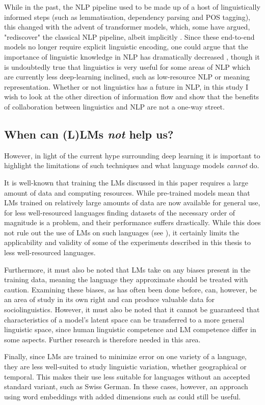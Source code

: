 While in the past, the NLP pipeline used to be made up of a host of linguistically informed steps (such as lemmatisation, dependency parsing and POS tagging), this changed with the advent of transformer models, which, some have argued, "rediscover" the classical NLP pipeline, albeit implicitly \citep{tenney2019bert}. Since these end-to-end models no longer require explicit linguistic encoding, one could argue that the importance of linguistic knowledge in NLP has dramatically decreased \citep{Church2021}, though it is undoubtedly true that linguistics is very useful for some areas of NLP which are currently less deep-learning inclined, such as low-resource NLP or meaning representation. Whether or not linguistics has a future in NLP, in this study I wish to look at the other direction of information flow and show that the benefits of collaboration between linguistics and NLP are not a one-way street.

\subsection*{When can (L)LMs \emph{not} help us?}
However, in light of the current hype surrounding deep learning it is important to highlight the limitations of such techniques and what language models \emph{cannot} do. 

It is well-known that training the LMs discussed in this paper requires a large amount of data and computing resources. While pre-trained models mean that LMs trained on relatively large amounts of data are now available for general use, for less well-resourced languages finding datasets of the necessary order of magnitude is a problem, and their performance suffers drastically. While this does not rule out the use of LMs on such languages (see \citep{kholodna2024llms}), it certainly limits the applicability and validity of some of the experiments described in this thesis to less well-resourced languages.

Furthermore, it must also be noted that LMs take on any biases present in the training data, meaning the language they approximate should be treated with caution. Examining these biases, as has often been done before, can, however, be an area of study in its own right and can produce valuable data for sociolinguistics. However, it must also be noted that it cannot be guaranteed that characteristics of a model's latent space can be transferred to a more general linguistic space, since human linguistic competence and LM competence differ in some aspects. Further research is therefore needed in this area.

Finally, since LMs are trained to minimize error on one variety of a language, they are less well-suited to study linguistic variation, whether geographical or temporal. This makes their use less suitable for languages without an accepted standard variant, such as Swiss German. In these cases, however, an approach using word embeddings with added dimensions such as \citet{hamilton-etal-2016-diachronic} could still be useful.